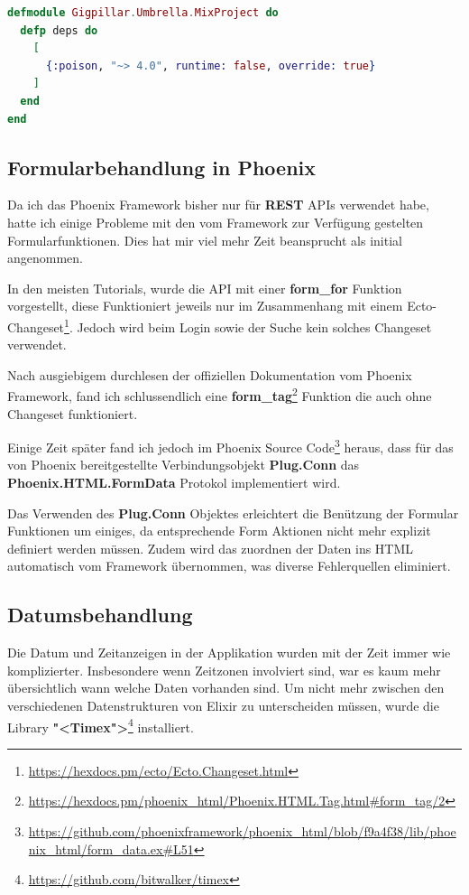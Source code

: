 \begin{lstlisting}[language=elixir,frame=single]
defmodule Gigpillar.Umbrella.MixProject do
  defp deps do
    [
      {:poison, "~> 4.0", runtime: false, override: true}
    ]
  end
end
\end{lstlisting}

\clearpage
\subsection{Formularbehandlung in Phoenix}

Da ich das Phoenix Framework bisher nur für \textbf{REST} APIs verwendet habe,
hatte ich einige Probleme mit den vom Framework zur Verfügung gestelten
Formularfunktionen.
Dies hat mir viel mehr Zeit beansprucht als initial angenommen.

In den meisten Tutorials, wurde die API mit einer \textbf{form\_for} Funktion
vorgestellt, diese Funktioniert jeweils nur im Zusammenhang mit einem
Ecto-Changeset\footnote{\url{https://hexdocs.pm/ecto/Ecto.Changeset.html}}.
Jedoch wird beim Login sowie der Suche kein solches Changeset verwendet.

Nach ausgiebigem durchlesen der offiziellen Dokumentation vom Phoenix Framework,
fand ich schlussendlich eine
\textbf{form\_tag}\footnote{\url{https://hexdocs.pm/phoenix\_html/Phoenix.HTML.Tag.html\#form\_tag/2}}
Funktion die auch ohne Changeset funktioniert.

Einige Zeit später fand ich jedoch im Phoenix Source Code\footnote{\url{https://github.com/phoenixframework/phoenix\_html/blob/f9a4f38/lib/phoenix\_html/form_data.ex\#L51}}
heraus, dass für das von Phoenix bereitgestellte Verbindungsobjekt
\textbf{Plug.Conn} das \textbf{Phoenix.HTML.FormData} Protokol implementiert
wird.

Das Verwenden des \textbf{Plug.Conn} Objektes erleichtert die Benützung der
Formular Funktionen um einiges, da entsprechende Form Aktionen nicht mehr
explizit definiert werden müssen. Zudem wird das zuordnen der Daten ins
HTML automatisch vom Framework übernommen, was diverse Fehlerquellen
eliminiert.

\subsection{Datumsbehandlung}

Die Datum und Zeitanzeigen in der Applikation wurden mit der Zeit immer wie
komplizierter. Insbesondere wenn Zeitzonen involviert sind, war es kaum mehr
übersichtlich wann welche Daten vorhanden sind. Um nicht mehr zwischen den
verschiedenen Datenstrukturen von Elixir zu unterscheiden müssen, wurde die
Library \textbf{"<Timex">}\footnote{\url{https://github.com/bitwalker/timex}}
installiert.

